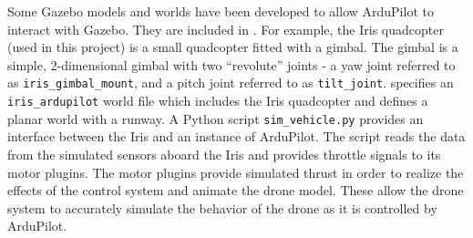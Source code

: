 Some Gazebo models and worlds have been developed to allow ArduPilot to interact with Gazebo. They are included in \cite{ardupilot_gazebo_plugin}. For example, the Iris quadcopter (used in this project) is a small quadcopter fitted with a gimbal. The gimbal is a simple, 2-dimensional gimbal with two ``revolute'' joints - a yaw joint referred to as \texttt{iris\_gimbal\_mount}, and a pitch joint referred to as \texttt{tilt\_joint}. \cite{ardupilot_gazebo_plugin} specifies an \texttt{iris\_ardupilot} world file which includes the Iris quadcopter and defines a planar world with a runway. A Python script \texttt{sim\_vehicle.py} provides an interface between the Iris and an instance of ArduPilot. The script reads the data from the simulated sensors aboard the Iris and provides throttle signals to its motor plugins. The motor plugins provide simulated thrust in order to realize the effects of the control system and animate the drone model. These allow the drone system to accurately simulate the behavior of the drone as it is controlled by ArduPilot.